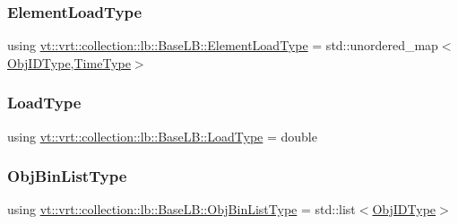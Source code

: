 \subsubsection{\texorpdfstring{Element\+Load\+Type}{ElementLoadType}}
{\footnotesize\ttfamily using \hyperlink{structvt_1_1vrt_1_1collection_1_1lb_1_1_base_l_b_aa286d31a0820a8fc9218ccb858368fca}{vt\+::vrt\+::collection\+::lb\+::\+Base\+L\+B\+::\+Element\+Load\+Type} =  std\+::unordered\+\_\+map$<$\hyperlink{structvt_1_1vrt_1_1collection_1_1lb_1_1_base_l_b_a15a2f756b59c8c2437985206b32aa403}{Obj\+I\+D\+Type},\hyperlink{namespacevt_a876a9d0cd5a952859c72de8a46881442}{Time\+Type}$>$}

\mbox{\label{structvt_1_1vrt_1_1collection_1_1lb_1_1_base_l_b_a215e22b9f12678303f49615ae3be05cc}} 
\subsubsection{\texorpdfstring{Load\+Type}{LoadType}}
{\footnotesize\ttfamily using \hyperlink{structvt_1_1vrt_1_1collection_1_1lb_1_1_base_l_b_a215e22b9f12678303f49615ae3be05cc}{vt\+::vrt\+::collection\+::lb\+::\+Base\+L\+B\+::\+Load\+Type} =  double}

\mbox{\label{structvt_1_1vrt_1_1collection_1_1lb_1_1_base_l_b_ab29c64ca66a928f34cf638dad6163f80}} 
\subsubsection{\texorpdfstring{Obj\+Bin\+List\+Type}{ObjBinListType}}
{\footnotesize\ttfamily using \hyperlink{structvt_1_1vrt_1_1collection_1_1lb_1_1_base_l_b_ab29c64ca66a928f34cf638dad6163f80}{vt\+::vrt\+::collection\+::lb\+::\+Base\+L\+B\+::\+Obj\+Bin\+List\+Type} =  std\+::list$<$\hyperlink{structvt_1_1vrt_1_1collection_1_1lb_1_1_base_l_b_a15a2f756b59c8c2437985206b32aa403}{Obj\+I\+D\+Type}$>$}


